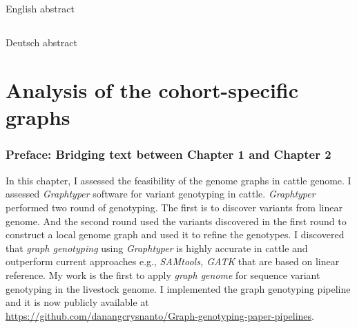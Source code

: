 \documentclass[12 pt, a4paper, notitlepage]{report}
\begin{document}
\newcommand*{\BuildingFromMainFile}{}






\setcounter{tocdepth}{1}
\hypersetup{linkcolor=black}
\tableofcontents
{}
\newpage

\listoffigures 
{}
\newpage

\listoftables 
{}
\newpage

\thispagestyle{plain}
\section*{}


English abstract

\newpage

\thispagestyle{plain}
\section*{}

Deutsch abstract

\newpage




\chapter[Cohort-specific cattle graphs]{\Large{Analysis of the cohort-specific graphs}}
\label{chap:locgraph}
\subsection*{Preface: Bridging text between Chapter 1 and Chapter 2}

In this chapter, I assessed the feasibility of the genome graphs in cattle genome. 
I assessed \emph{Graphtyper} software for variant genotyping in cattle.
\emph{Graphtyper} performed two round of genotyping. The first is to discover variants from linear
genome. And the second round used the variants discovered in the first round to construct a local genome graph and used it to refine the genotypes. I discovered that \textit{graph genotyping} using \textit{Graphtyper} is highly accurate in cattle and outperform current approaches e.g., \textit{SAMtools, \emph{GATK}} that are based on linear reference. My work is the first to apply \textit{graph genome} for sequence variant genotyping in the livestock genome.  I implemented the graph genotyping pipeline and it is now publicly available at \\  
\url{https://github.com/danangcrysnanto/Graph-genotyping-paper-pipelines}. \\ 
\end{document}

